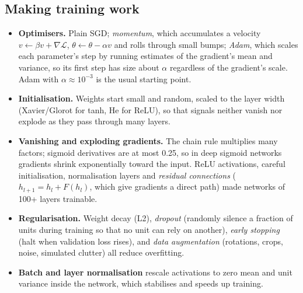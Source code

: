 \documentclass[11pt]{article}
\begin{document}
\subsection{Making training work}
\begin{itemize}
\item \textbf{Optimisers.} Plain SGD; \emph{momentum}, which accumulates a velocity $v\leftarrow\beta v+\nabla\mathcal L$, $\theta\leftarrow\theta-\alpha v$ and rolls through small bumps; \emph{Adam}, which scales each parameter's step by running estimates of the gradient's mean and variance, so its first step has size about $\alpha$ regardless of the gradient's scale. Adam with $\alpha\approx10^{-3}$ is the usual starting point.
\item \textbf{Initialisation.} Weights start small and random, scaled to the layer width (Xavier/Glorot for tanh, He for ReLU), so that signals neither vanish nor explode as they pass through many layers.
\item \textbf{Vanishing and exploding gradients.} The chain rule multiplies many factors; sigmoid derivatives are at most 0.25, so in deep sigmoid networks gradients shrink exponentially toward the input. ReLU activations, careful initialisation, normalisation layers and \emph{residual connections} ($h_{l+1}=h_l+F(h_l)$, which give gradients a direct path) made networks of 100+ layers trainable.
\item \textbf{Regularisation.} Weight decay (L2), \emph{dropout} (randomly silence a fraction of units during training so that no unit can rely on another), \emph{early stopping} (halt when validation loss rises), and \emph{data augmentation} (rotations, crops, noise, simulated clutter) all reduce overfitting.
\item \textbf{Batch and layer normalisation} rescale activations to zero mean and unit variance inside the network, which stabilises and speeds up training.
\end{itemize}
\end{document}
